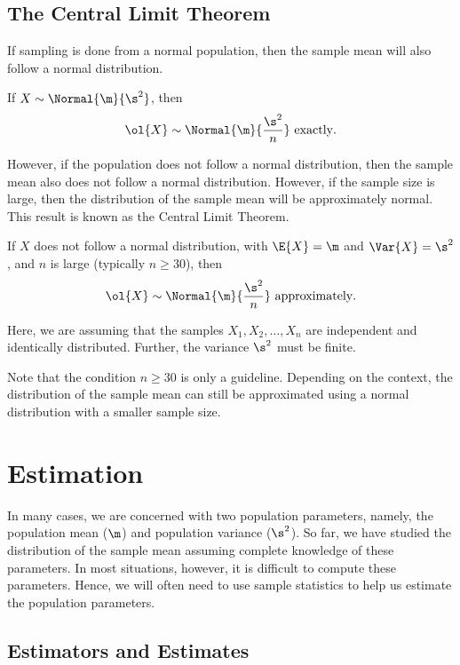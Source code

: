 \subsection{The Central Limit Theorem}

If sampling is done from a normal population, then the sample mean will also follow a normal distribution.

\begin{proposition}
    If $X \sim \Normal{\m}{\s^2}$, then \[\ol{X} \sim \Normal{\m}{\frac{\s^2}{n}} \text{ exactly}.\]
\end{proposition}

However, if the population does not follow a normal distribution, then the sample mean also does not follow a normal distribution. However, if the sample size is large, then the distribution of the sample mean will be approximately normal. This result is known as the Central Limit Theorem.

\begin{theorem}
    If $X$ does not follow a normal distribution, with $\E{X} = \m$ and $\Var{X} = \s^2$, and $n$ is large (typically $n \geq 30$), then \[\ol{X} \sim \Normal{\m}{\frac{\s^2}{n}} \text{ approximately}.\]
\end{theorem}

Here, we are assuming that the samples $X_1, X_2, \dots, X_n$ are independent and identically distributed. Further, the variance $\s^2$ must be finite.

Note that the condition $n \geq 30$ is only a guideline. Depending on the context, the distribution of the sample mean can still be approximated using a normal distribution with a smaller sample size.

\section{Estimation}

In many cases, we are concerned with two population parameters, namely, the population mean ($\m$) and population variance ($\s^2$). So far, we have studied the distribution of the sample mean assuming complete knowledge of these parameters. In most situations, however, it is difficult to compute these parameters. Hence, we will often need to use sample statistics to help us estimate the population parameters.

\subsection{Estimators and Estimates}

